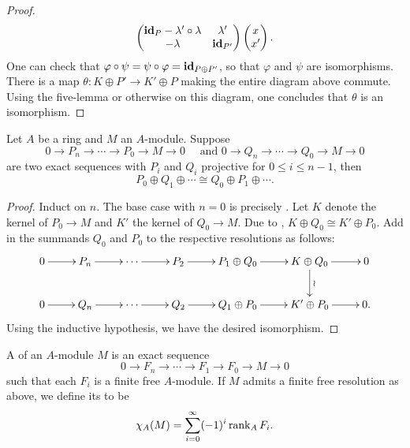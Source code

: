 \begin{proof}
\begin{equation*}
        \begin{pmatrix}
            \mathbf{id}_P - \lambda'\circ\lambda & \lambda'\\
            -\lambda & \mathbf{id}_{P'}
        \end{pmatrix}
        \begin{pmatrix}
            x\\x'
        \end{pmatrix}.
    \end{equation*}
    One can check that $\varphi\circ\psi = \psi\circ\varphi = \mathbf{id}_{P\oplus P'}$, so that $\varphi$ and $\psi$ are isomorphisms. There is a map $\theta\colon K\oplus P'\to K'\oplus P$ making the entire diagram above commute. Using the five-lemma or otherwise on this diagram, one concludes that $\theta$ is an isomorphism.
\end{proof}

\begin{lemma}
    Let $A$ be a ring and $M$ an $A$-module. Suppose 
    \begin{equation*}
        0\to P_n\to\cdots\to P_0\to M\to 0\quad\text{ and } 0\to Q_n\to\cdots\to Q_0\to M\to 0
    \end{equation*}
    are two exact sequences with $P_i$ and $Q_i$ projective for $0\le i\le n - 1$, then 
    \begin{equation*}
        P_0\oplus Q_1\oplus\cdots\cong Q_0\oplus P_1\oplus\cdots.
    \end{equation*}
\end{lemma}
\begin{proof}
    Induct on $n$. The base  case with $n = 0$ is precisely . Let $K$ denote the kernel of $P_0\to M$ and $K'$ the kernel of $Q_0\to M$. Due to , $K\oplus Q_0\cong K'\oplus P_0$. Add in the summands $Q_0$ and $P_0$ to the respective resolutions as follows: 
    \begin{equation*}
        \xymatrix {
            0\ar[r] & P_n\ar[r] & \cdots\ar[r] & P_2\ar[r] & P_1\oplus Q_0\ar[r] & K\oplus Q_0\ar[r]\ar[d]^\wr & 0\\
            0\ar[r] & Q_n\ar[r] & \cdots\ar[r] & Q_2\ar[r] & Q_1\oplus P_0\ar[r] & K'\oplus P_0\ar[r] & 0.
        }
    \end{equation*}
    Using the inductive hypothesis, we have the desired isomorphism.
\end{proof}

\begin{definition}
    A  of an $A$-module $M$ is an exact sequence 
    \begin{equation*}
        0\to F_n\to\cdots \to F_1\to F_0\to M\to 0
    \end{equation*}
    such that each $F_i$ is a finite free $A$-module. If $M$ admits a finite free resolution as above, we define its  to be 
    \begin{equation*}
        \chi_A(M) = \sum_{i = 0}^\infty (-1)^i \operatorname{rank}_A F_i.
    \end{equation*}
\end{definition}

